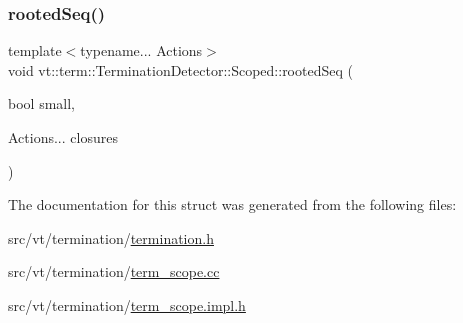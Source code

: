 \mbox{\label{structvt_1_1term_1_1_termination_detector_1_1_scoped_a80cfbd2ebb5cb7acec0be212bdf7eb76}} 
\subsubsection{\texorpdfstring{rooted\+Seq()}{rootedSeq()}}
{\footnotesize\ttfamily template$<$typename... Actions$>$ \\
void vt\+::term\+::\+Termination\+Detector\+::\+Scoped\+::rooted\+Seq (\begin{DoxyParamCaption}\item[{bool}]{small,  }\item[{Actions...}]{closures }\end{DoxyParamCaption})\hspace{0.3cm}{\ttfamily [static]}}



The documentation for this struct was generated from the following files\+:\begin{DoxyCompactItemize}
\item 
src/vt/termination/\hyperlink{termination_8h}{termination.\+h}\item 
src/vt/termination/\hyperlink{term__scope_8cc}{term\+\_\+scope.\+cc}\item 
src/vt/termination/\hyperlink{term__scope_8impl_8h}{term\+\_\+scope.\+impl.\+h}\end{DoxyCompactItemize}
